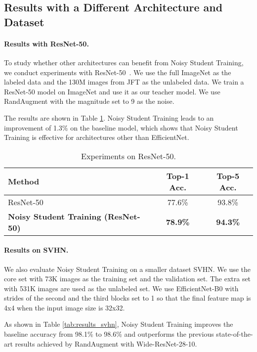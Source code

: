 \documentclass[10pt,twocolumn,letterpaper]{article}
\begin{document}
\subsection{Results with a Different Architecture and Dataset}
\paragraph{Results with ResNet-50.} To study whether other architectures can benefit from Noisy Student Training, we conduct experiments with ResNet-50~\cite{he2016deep}. We use the full ImageNet as the labeled data and the 130M images from JFT as the unlabeled data. We train a ResNet-50 model on ImageNet and use it as our teacher model. We use RandAugment with the magnitude set to 9 as the noise. 

The results are shown in Table \ref{tab:results_resnet_50}. Noisy Student Training leads to an improvement of 1.3\% on the baseline model, which shows that Noisy Student Training is effective for architectures other than EfficientNet.

\begin{table}[h!]
\footnotesize
    \centering
        \begin{tabular}{l|cc}
        \toprule 
        Method &  Top-1 Acc. & Top-5 Acc.  \\
        \midrule      
	    ResNet-50  & 77.6\% & 93.8\% \\
		\bf Noisy Student Training (ResNet-50) & \bf 78.9\% & \bf 94.3\%  \\
        \bottomrule
        \end{tabular}
    \caption{Experiments on ResNet-50.}
    \label{tab:results_resnet_50}
\end{table}


\paragraph{Results on SVHN.} We also evaluate Noisy Student Training on a smaller dataset SVHN. We use the core set with 73K images as the training set and the validation set. The extra set with 531K images are used as the unlabeled set. We use EfficientNet-B0 with strides of the second and the third blocks set to 1 so that the final feature map is 4x4 when the input image size is 32x32. 

As shown in Table \ref{tab:results_svhn}, Noisy Student Training improves the baseline accuracy from 98.1\% to 98.6\% and outperforms the previous state-of-the-art results achieved by RandAugment with Wide-ResNet-28-10.
\end{document}
